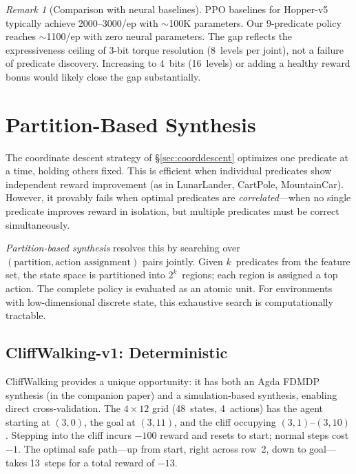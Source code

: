 \documentclass[9pt,a4paper]{article}
\theoremstyle{plain}
\theoremstyle{definition}
\theoremstyle{remark}
\newtheorem{remark}{Remark}
\begin{document}
\begin{remark}[Comparison with neural baselines]
PPO baselines for Hopper-v5 typically achieve 2000--3000/ep with
$\sim$100K parameters.  Our 9-predicate policy reaches $\sim$1100/ep
with zero neural parameters.  The gap reflects the expressiveness
ceiling of 3-bit torque resolution (8~levels per joint), not a
failure of predicate discovery.  Increasing to 4~bits (16~levels)
or adding a healthy reward bonus would likely close the gap
substantially.
\end{remark}

\section{Partition-Based Synthesis}
\label{sec:partition}

The coordinate descent strategy of \S\ref{sec:coorddescent} optimizes one predicate at a time, holding others fixed.  This is efficient when individual predicates show independent reward improvement (as in LunarLander, CartPole, MountainCar).  However, it provably fails when optimal predicates are \emph{correlated}---when no single predicate improves reward in isolation, but multiple predicates must be correct simultaneously.

\emph{Partition-based synthesis} resolves this by searching over $(\text{partition}, \text{action assignment})$ pairs jointly.  Given $k$~predicates from the feature set, the state space is partitioned into $2^k$~regions; each region is assigned a top action.  The complete policy is evaluated as an atomic unit.  For environments with low-dimensional discrete state, this exhaustive search is computationally tractable.

\subsection{CliffWalking-v1: Deterministic}

CliffWalking provides a unique opportunity: it has both an Agda FDMDP synthesis (in the companion paper) and a simulation-based synthesis, enabling direct cross-validation.  The $4 \times 12$ grid (48~states, 4~actions) has the agent starting at $(3,0)$, the goal at $(3,11)$, and the cliff occupying $(3,1)$--$(3,10)$.  Stepping into the cliff incurs $-100$ reward and resets to start; normal steps cost $-1$.  The optimal safe path---up from start, right across row~2, down to goal---takes 13~steps for a total reward of $-13$.
\end{document}
